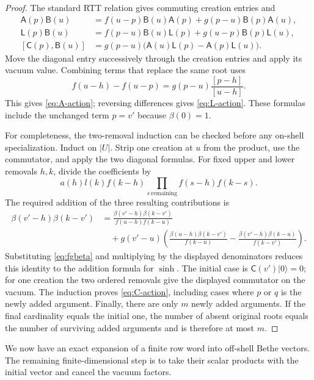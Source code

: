 \begin{proof}
The standard RTT relation gives commuting creation entries and
\begin{align*}
 \mathsf A(p)\mathsf B(u)
  &=f(u-p)\mathsf B(u)\mathsf A(p)
        +g(p-u)\mathsf B(p)\mathsf A(u),\\
 \mathsf L(p)\mathsf B(u)
  &=f(p-u)\mathsf B(u)\mathsf L(p)
        +g(u-p)\mathsf B(p)\mathsf L(u),\\
 [\mathsf C(p),\mathsf B(u)]
  &=g(p-u)\bigl(\mathsf A(u)\mathsf L(p)
                    -\mathsf A(p)\mathsf L(u)\bigr).
\end{align*}
Move the diagonal entry successively through the creation entries and
apply its vacuum value.  Combining terms that replace the same root
uses
\[
 f(u-h)-f(u-p)=g(p-u)\frac{[p-h]}{[u-h]}.
\]
This gives \eqref{eq:A-action}; reversing differences gives
\eqref{eq:L-action}.  These formulas include the unchanged term $p=v'$
because $\beta(0)=1$.

For completeness, the two-removal induction can be checked before any
on-shell specialization.  Induct on $|U|$. Strip one creation at $u$ from the product,
use the commutator, and apply the two diagonal formulas.  For fixed
upper and lower removals $h,k$, divide the coefficients by
\[
 a(h)l(k)f(k-h)\prod_{s\ {\mathrm{remaining}}}f(s-h)f(k-s).
\]
The required addition of the three resulting contributions is
\begin{align*}
 \beta(v'-h)\beta(k-v')
 &=\frac{\beta(v'-h)\beta(k-v')}{f(u-h)f(k-u)}\\
 &\quad+g(v'-u)\left(
       \frac{\beta(u-h)\beta(k-v')}{f(k-u)}
       -\frac{\beta(v'-h)\beta(k-u)}{f(k-v')}\right).
\end{align*}
Substituting \eqref{eq:fgbeta} and multiplying by the displayed
denominators reduces this identity to the addition formula for
$\sinh$.  The initial case is $\mathsf C(v')|0\rangle=0$; for one
creation the two ordered removals give the displayed commutator on the
vacuum.  The induction proves \eqref{eq:C-action}, including cases
where $p$ or $q$ is the newly added argument.  Finally, there are only
$m$ newly added arguments.  If the final cardinality equals the initial
one, the number of absent original roots equals the number of
surviving added arguments and is therefore at most $m$.
\end{proof}

We now have an exact expansion of a finite row word into off-shell
Bethe vectors.  The remaining finite-dimensional step is to take their
scalar products with the initial vector and cancel the vacuum factors.


